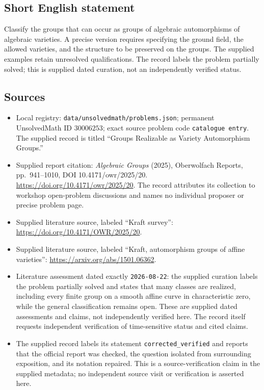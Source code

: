 \documentclass[11pt]{article}
\begin{document}
\subsection{Short English statement}
Classify the groups that can occur as groups of algebraic automorphisms of algebraic varieties. A precise version requires specifying the ground field, the allowed varieties, and the structure to be preserved on the groups. The supplied examples retain unresolved qualifications. The record labels the problem partially solved; this is supplied dated curation, not an independently verified status.
\subsection{Sources}
\begin{itemize}
\item Local registry: \texttt{data/unsolvedmath/problems.json}; permanent UnsolvedMath ID \(30006253\); exact source problem code \texttt{catalogue entry}. The supplied record is titled ``Groups Realizable as Variety Automorphism Groups.''
\item Supplied report citation: \emph{Algebraic Groups} (2025), Oberwolfach Reports, pp.\ 941--1010, DOI 10.4171/owr/2025/20. \url{https://doi.org/10.4171/owr/2025/20}. The record attributes its collection to workshop open-problem discussions and names no individual proposer or precise problem page.
\item Supplied literature source, labeled ``Kraft survey'': \url{https://doi.org/10.4171/OWR/2025/20}.
\item Supplied literature source, labeled ``Kraft, automorphism groups of affine varieties'': \url{https://arxiv.org/abs/1501.06362}.
\item Literature assessment dated exactly \texttt{2026-08-22}: the supplied curation labels the problem partially solved and states that many classes are realized, including every finite group on a smooth affine curve in characteristic zero, while the general classification remains open. These are supplied dated assessments and claims, not independently verified here. The record itself requests independent verification of time-sensitive status and cited claims.
\item The supplied record labels its statement \texttt{corrected\_verified} and reports that the official report was checked, the question isolated from surrounding exposition, and its notation repaired. This is a source-verification claim in the supplied metadata; no independent source visit or verification is asserted here.
\end{itemize}
\end{document}

